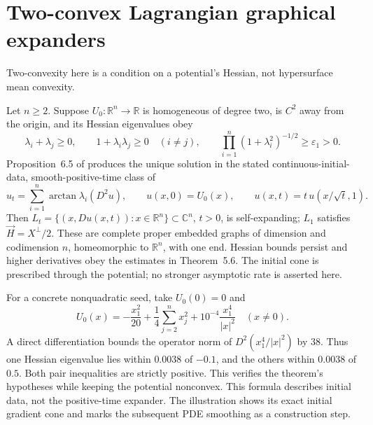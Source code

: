 \chapter{Two-convex Lagrangian graphical expanders}\label{sec:catalogue-ttw-expanders}
Two-convexity here is a condition on a potential's Hessian, not hypersurface mean convexity.
\begin{example}\label{ex:catalogue-ttw-expanders}
Let $n\geq2$. Suppose $U_0:\mathbb R^n\to\mathbb R$ is homogeneous of degree two, is $C^2$ away from the origin, and its Hessian eigenvalues obey
\[
 \lambda_i+\lambda_j\geq0,\qquad 1+\lambda_i\lambda_j\geq0\quad(i\ne j),
 \qquad \prod_{i=1}^n(1+\lambda_i^2)^{-1/2}\geq\varepsilon_1>0.
\]
Proposition~6.5 of \cite{CatTsaiTsuiWang2025} produces the unique solution in the stated continuous-initial-data, smooth-positive-time class of
\[
 u_t=\sum_{i=1}^n\arctan\lambda_i(D^2u),\qquad
 u(x,0)=U_0(x),\qquad u(x,t)=t\,u(x/\sqrt t,1).
\]
Then $L_t=\{(x,Du(x,t)):x\in\mathbb R^n\}\subset\mathbb C^n$, $t>0$, is self-expanding; $L_1$ satisfies $\vec H=X^\perp/2$. These are complete proper embedded graphs of dimension and codimension $n$, homeomorphic to $\mathbb R^n$, with one end. Hessian bounds persist and higher derivatives obey the estimates in Theorem~5.6. The initial cone is prescribed through the potential; no stronger asymptotic rate is asserted here.

For a concrete nonquadratic seed, take $U_0(0)=0$ and
\[
 U_0(x)=-\frac{x_1^2}{20}+\frac14\sum_{j=2}^nx_j^2
          +10^{-4}\frac{x_1^4}{|x|^2}\quad(x\ne0).
\]
A direct differentiation bounds the operator norm of $D^2(x_1^4/|x|^2)$ by $38$. Thus one Hessian eigenvalue lies within $0.0038$ of $-0.1$, and the others within $0.0038$ of $0.5$. Both pair inequalities are strictly positive. This verifies the theorem's hypotheses while keeping the potential nonconvex. This formula describes initial data, not the positive-time expander. The illustration shows its exact initial gradient cone and marks the subsequent PDE smoothing as a construction step.
\end{example}

